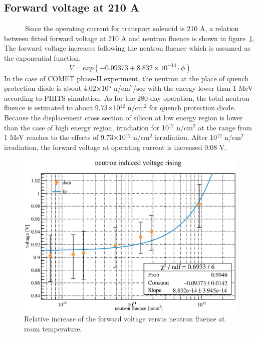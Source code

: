 \subsection{Forward voltage at 210 A}
~~~~~~Since the operating current for transport solenoid is 210 A, a relation between fitted forward voltage at 210 A and neutron fluence is shown in figure~\ref{3diode}.
The forward voltage increases following the neutron fluence which is assumed as the exponential function.
\begin{equation}
 V = exp(-0.09373 + 8.832 \times 10^{-14} \cdot \phi)
\end{equation}
In the case of COMET phase-II experiment, the neutron at the place of quench protection diode is about 4.02$\times$10$^5$ n/cm$^2$/sec with the energy lower than 1 MeV  according to PHITS simulation.
As for the 280-day operation, the total neutron fluence is estimated to about 9.73$\times$10$^{12}$ n/cm$^2$ for quench protection diode.
Because the displacement cross section of silicon at low energy region is lower than the case of high energy region, irradiation for 10$^{12}$ n/cm$^2$ at the range from 1 MeV reaches to the effects of 9.73$\times$10$^{12}$ n/cm$^2$ irradiation.
After 10$^{12}$ n/cm$^2$ irradiation, the forward voltage at operating current is increased 0.08 V.
  \begin{figure}[H]
   \centering
   \includegraphics[scale=0.5]{chapter4/fig/dioderesult.eps}
   \caption{Relative increase of the forward voltage versus neutron fluence at room temperature.}
   \label{3diode}
  \end{figure}

